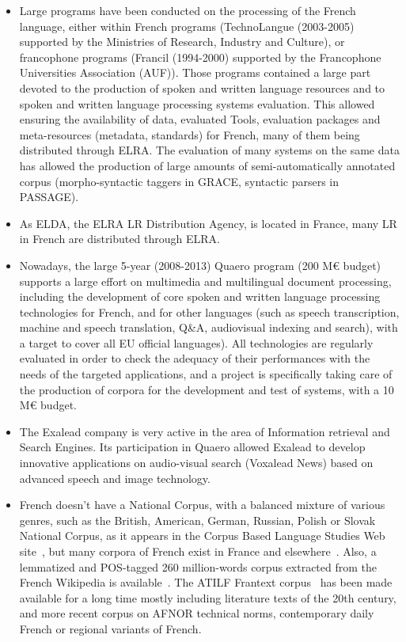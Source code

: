 \begin{multicols}{2}
\begin{itemize}
\item Large programs have been conducted on the processing of the French
language, either within French programs (TechnoLangue (2003-2005)
supported by the Ministries of Research, Industry and Culture), or
francophone programs (Francil (1994-2000) supported by the Francophone
Universities Association (AUF)). Those programs contained a large part
devoted to the production of spoken and written language resources and
to spoken and written language processing systems evaluation. This
allowed ensuring the availability of data, evaluated Tools, evaluation
packages and meta-resources (metadata, standards) for French, many of
them being distributed through ELRA. The evaluation of many systems on
the same data has allowed the production of large amounts of
semi-automatically annotated corpus (morpho-syntactic taggers in GRACE,
syntactic parsers in PASSAGE).

\item As ELDA, the ELRA LR Distribution Agency, is located in France, many
LR in French are distributed through ELRA.

\item Nowadays, the large 5-year (2008-2013) Quaero program (200 M€
  budget) supports a large effort on multimedia and multilingual
  document processing, including the development of core spoken and
  written language processing technologies for French, and for other
  languages (such as speech transcription, machine and speech
  translation, Q\&A, audiovisual indexing and search), with a target
  to cover all EU official languages). All technologies are regularly
  evaluated in order to check the adequacy of their performances with
  the needs of the targeted applications, and a project is
  specifically taking care of the production of corpora for the
  development and test of systems, with a 10 M€ budget.

\item The Exalead company is very active in the area of Information
retrieval and Search Engines. Its participation in Quaero allowed
Exalead to develop innovative applications on audio-visual search
(Voxalead News) based on advanced speech and image technology.

\item French doesn’t have a National Corpus, with a balanced mixture of
various genres, such as the British, American, German, Russian, Polish
or Slovak National Corpus, as it appears in the Corpus Based Language
Studies Web site~\cite{corpuslangstud}, but many corpora of French exist in France and
elsewhere~\cite{corpusfr}. Also, a lemmatized and POS-tagged 260 million-words
corpus extracted from the French Wikipedia is available~\cite{wikipediafr}. The ATILF
Frantext corpus~\cite{atilf} has been made available for a long time mostly
including literature texts of the 20th century, and more recent corpus
on AFNOR technical norms, contemporary daily French or regional
variants of French.


\end{itemize}
\end{multicols}
